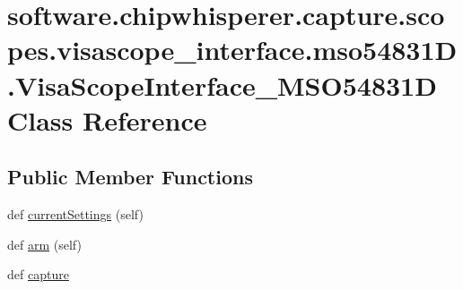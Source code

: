 \hypertarget{classsoftware_1_1chipwhisperer_1_1capture_1_1scopes_1_1visascope__interface_1_1mso54831D_1_1VisaScopeInterface__MSO54831D}{}\section{software.\+chipwhisperer.\+capture.\+scopes.\+visascope\+\_\+interface.\+mso54831\+D.\+Visa\+Scope\+Interface\+\_\+\+M\+S\+O54831\+D Class Reference}
\label{classsoftware_1_1chipwhisperer_1_1capture_1_1scopes_1_1visascope__interface_1_1mso54831D_1_1VisaScopeInterface__MSO54831D}
\subsection*{Public Member Functions}
\begin{DoxyCompactItemize}
\item 
def \hyperlink{classsoftware_1_1chipwhisperer_1_1capture_1_1scopes_1_1visascope__interface_1_1mso54831D_1_1VisaScopeInterface__MSO54831D_a2f8b3f848ea1bcdcc8e9e472942e2537}{current\+Settings} (self)
\item 
def \hyperlink{classsoftware_1_1chipwhisperer_1_1capture_1_1scopes_1_1visascope__interface_1_1mso54831D_1_1VisaScopeInterface__MSO54831D_a4a2826fe5a2000adc2d34a244dcd6f73}{arm} (self)
\item 
def \hyperlink{classsoftware_1_1chipwhisperer_1_1capture_1_1scopes_1_1visascope__interface_1_1mso54831D_1_1VisaScopeInterface__MSO54831D_a95033b83730a304f36f3c156061d0518}{capture}
\end{DoxyCompactItemize}

